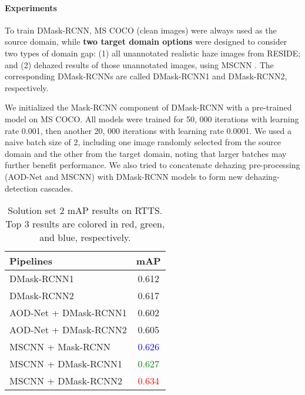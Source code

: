 \documentclass[10pt,twocolumn,letterpaper]{article}
\begin{document}

\paragraph{Experiments} To train DMask-RCNN, MS COCO (clean images) were always used as the source domain, while \textbf{two target domain options} were designed to consider two types of domain gap: (1) all unannotated realistic haze images from RESIDE; and (2) dehazed results of those unannotated  images, using MSCNN \cite{ren2016single}. The corresponding DMask-RCNNs are called DMask-RCNN1 and DMask-RCNN2, respectively. 

We initialized the Mask-RCNN component of DMask-RCNN with a pre-trained model on MS COCO. All models were trained for 50, 000 iterations with learning rate 0.001, then another 20, 000 iterations with learning rate 0.0001. We used a naive batch size of 2, including one image randomly selected from the source domain and the other from the target domain, noting that larger batches may further benefit performance. We also tried to concatenate dehazing pre-processing (AOD-Net and MSCNN) with DMask-RCNN models to form new dehazing-detection cascades.


\begin{table}[t]
\begin{center}
\begin{tabular}{|l|c|}
\hline
\textbf{Pipelines} & \textbf{mAP} \\ 
 \hline
DMask-RCNN1 & 0.612 \\ \hline
DMask-RCNN2 & 0.617 \\ \hline
\hline
AOD-Net + DMask-RCNN1 & 0.602 \\ \hline
AOD-Net + DMask-RCNN2 & 0.605 \\ \hline
\hline
MSCNN + Mask-RCNN & \textcolor{blue}{0.626} \\ \hline
MSCNN + DMask-RCNN1 & \textcolor{green}{0.627} \\ \hline
MSCNN + DMask-RCNN2 & \textcolor{red}{0.634} \\ \hline
\end{tabular}
\end{center}
\caption{Solution set 2 mAP results on RTTS. Top 3 results are colored in red, green, and blue, respectively.}
\label{detection2}
\end{table}
\end{document}
